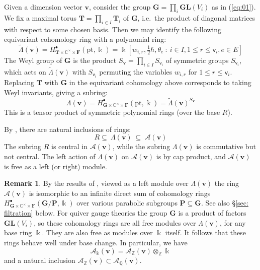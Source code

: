 \documentclass[11pt,reqno]{amsart}
\renewcommand{\mathbf}{\mathbold}
\numberwithin{equation}{section}
\theoremstyle{definition}
\newtheorem{Remark}[equation]{Remark}
\newcommand{\cA}{\mathcal{A}}
\newcommand{\bF}{\mathbf{F}}
\newcommand{\bG}{\mathbf{G}}
\newcommand{\bP}{\mathbf{P}}
\newcommand{\bT}{\mathbf{T}}
\newcommand{\bv}{\mathbf{v}}
\newcommand{\CC}{\mathbb{C}}
\newcommand{\QQ}{\mathbb{Q}}
\newcommand{\ZZ}{\mathbb{Z}}
\newcommand{\GL}{\mathbf{GL}}
\newcommand{\pt}{\mathrm{pt}}
\newcommand{\kk}{\Bbbk}
\renewcommand{\bv}{\mathbf{v}} %
\newcommand{\sv}{\mathsf{v}}
\newcommand{\vertexset}{I}
\newcommand{\arrowset}{E}
\newcommand{\GT}{\Lambda}
\newcommand{\tGT}{\widetilde{\Lambda}}
\newcommand{\base}{R}
\newcommand{\qzast}{\cA}
\begin{document}
Given a dimension vector $\bv$,  consider the group $\bG = \prod_i \GL(V_i)$ as in (\ref{eq:01}).  We  fix a maximal torus $\bT = \prod_{i \in \vertexset} \bT_i$ of $\bG$, i.e.~the product of diagonal matrices with respect to some chosen basis.  Then we may identify the following equivariant cohomology ring with a polynomial ring:
\begin{equation}
\label{eq: GT with no Weyl}
\tGT(\bv) = H_{\bT\times \CC^\times\times \bF}^\bullet(\pt, \kk) = \kk[w_{i,r}, \tfrac{1}{2}\hbar, \theta_e \ : \ i \in \vertexset, 1 \leq r \leq \sv_i, e \in \arrowset]
\end{equation}
The Weyl group of $\bG$ is the product $S_{\bv} = \prod_{i \in \vertexset} S_{\sv_i}$ of symmetric groups $S_{\sv_i}$, which acts on $\tGT(\bv)$ with $S_{\sv_i}$ permuting the variables $w_{i,r}$ for $1 \leq r \leq \sv_i$.   Replacing $\bT$ with $\bG$ in the equivariant cohomology above corresponds to taking Weyl invariants, giving a subring:
\begin{equation}
\label{eq: GT subalgebra}
\GT(\bv) = H_{\bG\times \CC^\times\times \bF}^\bullet(\pt, \kk)  =\tGT(\bv)^{S_\bv}
\end{equation}
This is a tensor product of symmetric polynomial rings (over the base $\base$).

By \cite[\S 3(vi)]{BFN1}, there are natural inclusions of rings:
\begin{equation}
\label{eq: integrable system}
\base \subseteq \ \GT(\bv) \ \subseteq \ \qzast(\bv)
\end{equation}
The subring $\base$ is central in $\qzast(\bv)$, while the subring $\GT(\bv)$ is commutative but not central.  The left action of $\GT(\bv)$ on $\qzast(\bv)$ is by cap product, and $\qzast(\bv)$ is free as a left (or right) module.


\begin{Remark}
    By the results of \cite[\S 2(iii)]{BFN1}, viewed as a left module over $\GT(\bv)$ the ring $\qzast(\bv)$ is isomorphic to an infinite direct sum of cohomology rings $H_{\bG \times \CC^\times \times \bF}^\bullet(\bG / \bP, \kk)$ over various parabolic subgroups $\bP \subseteq \bG$. See also \S \ref{sec: filtration} below. For quiver gauge theories the group $\bG$ is a product of factors $\GL(V_i)$, so these cohomology rings are all free modules over $\GT(\bv)$, for any base ring $\kk$. They are also free as modules over $\kk$ itself.   It follows that these rings behave well under base change.  In particular, we have 
    \begin{equation}
        \qzast_\kk(\bv) = \qzast_\ZZ(\bv) \otimes_\ZZ \kk
    \end{equation}
    and a natural inclusion $\qzast_\ZZ(\bv) \subset \qzast_\QQ(\bv)$.
\end{Remark}
\end{document}
